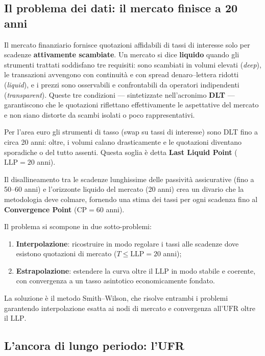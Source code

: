 \documentclass[11pt,a4paper]{article}
\theoremstyle{plain}
\theoremstyle{definition}
\theoremstyle{remark}
\newcommand{\UFR}{\ensuremath{\mathrm{UFR}}}
\newcommand{\LLP}{\ensuremath{\mathrm{LLP}}}
\newcommand{\CP}{\ensuremath{\mathrm{CP}}}
\begin{document}
\subsection{Il problema dei dati: il mercato finisce a 20 anni}

Il mercato finanziario fornisce quotazioni affidabili di tassi di interesse solo per scadenze
\textbf{attivamente scambiate}. Un mercato si dice \textbf{liquido} quando gli strumenti
trattati soddisfano tre requisiti: sono scambiati in volumi elevati (\emph{deep}), le
transazioni avvengono con continuità e con spread denaro--lettera ridotti (\emph{liquid}),
e i prezzi sono osservabili e confrontabili da operatori indipendenti (\emph{transparent}).
Queste tre condizioni --- sintetizzate nell'acronimo \textbf{DLT} --- garantiscono che le
quotazioni riflettano effettivamente le aspettative del mercato e non siano distorte da
scambi isolati o poco rappresentativi.

Per l'area euro gli strumenti di tasso (swap su tassi di interesse) sono DLT fino a
circa 20 anni: oltre, i volumi calano drasticamente e le quotazioni diventano sporadiche
o del tutto assenti. Questa soglia \`e detta \textbf{Last Liquid Point} ($\LLP = 20$ anni).

Il disallineamento tra le scadenze lunghissime delle passivit\`a assicurative (fino a 50--60
anni) e l'orizzonte liquido del mercato (20 anni) crea un divario che la metodologia deve
colmare, fornendo una stima dei tassi per ogni scadenza fino al \textbf{Convergence Point}
($\CP = 60$ anni).

Il problema si scompone in due sotto-problemi:
\begin{enumerate}
  \item \textbf{Interpolazione}: ricostruire in modo regolare i tassi alle scadenze dove
        esistono quotazioni di mercato ($T \le \LLP = 20$ anni);
  \item \textbf{Estrapolazione}: estendere la curva oltre il $\LLP$ in modo stabile e
        coerente, con convergenza a un tasso asintotico economicamente fondato.
\end{enumerate}

La soluzione \`e il metodo Smith--Wilson, che risolve entrambi i problemi garantendo
interpolazione esatta ai nodi di mercato e convergenza all'$\UFR$ oltre il $\LLP$.

\subsection{L'ancora di lungo periodo: l'UFR}
\end{document}
